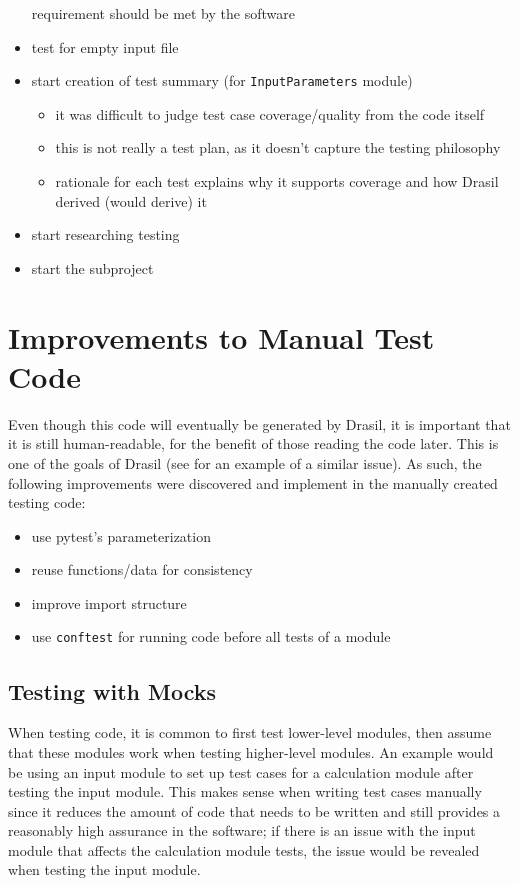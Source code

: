 \begin{itemize}
            requirement should be met by the software
      \item test for empty input file
      \item start creation of test summary (for \texttt{InputParameters} module)
            \begin{itemize}
                  \item it was difficult to judge test case coverage/quality from
                        the code itself
                  \item this is not really a test plan, as it doesn't capture the
                        testing philosophy
                  \item rationale for each test explains why it supports coverage
                        and how Drasil derived (would derive) it
            \end{itemize}
      \item start researching testing
      \item start the  subproject
\end{itemize}

\section{Improvements to Manual Test Code}

Even though this code will eventually be generated by Drasil, it is important
that it is still human-readable, for the benefit of those reading the code
later. This is one of the goals of Drasil (see  for an example
of a similar issue). As such, the following improvements were discovered and
implement in the manually created testing code:

\begin{itemize}
      \item use pytest's parameterization
      \item reuse functions/data for consistency
      \item improve import structure
      \item use \texttt{conftest} for running code before all tests of a module
\end{itemize}

\subsection{Testing with Mocks}

When testing code, it is common to first test lower-level modules, then assume
that these modules work when testing higher-level modules. An example would be
using an input module to set up test cases for a calculation module after
testing the input module. This makes sense when writing test cases manually
since it reduces the amount of code that needs to be written and still provides
a reasonably high assurance in the software; if there is an issue with the
input module that affects the calculation module tests, the issue would be
revealed when testing the input module.

